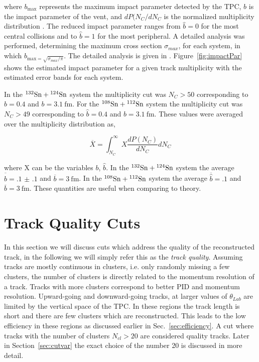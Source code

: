 where $b_{\mathrm{max}}$ represents the maximum impact parameter detected by the TPC, $b$ is the impact parameter of the vent,  and $dP(N_C/dN_C$ is the normalized multiplicity distribution \cite{reducedimpact}. The reduced impact parameter ranges from $\hat{b}=0$ for the most central collisions and to $\hat{b}=1$ for the most peripheral. A  detailed analysis was performed, determining the maximum cross section $\sigma_{max}$, for each system, in which $b_{\mathrm{max} = \sqrt{\sigma_{max}/\pi}}$. The detailed analysis is given in \cite{jon}. Figure~\ref{fig:impactPar} shows the estimated impact parameter for a given track multiplicity with the estimated error bands for each system. 

In the ${}^{132}\mathrm{Sn} + {}^{124}\mathrm{Sn}$ system the multiplicity cut was $N_C > 50$ corresponding to $\hat{b} = 0.4$ and $b = \SI{3.1}{\femto\metre}$. For the ${}^{108}\mathrm{Sn} + {}^{112}\mathrm{Sn}$ system the multiplicity cut was $N_C > 49$ corresponding to $\hat{b} = 0.4$ and $b = \SI{3.1}{\femto\metre}$. These values were averaged over the multiplicity distribution as,

\begin{equation}
 \overline{X} = \int_{N_C}^{\infty} X\frac{dP(N_C)}{dN_C} dN_C
\end{equation}

where X can be the variables $b$, $\hat{b}$. In the ${}^{132}\mathrm{Sn} + {}^{124}\mathrm{Sn}$ system the average $\overline{\hat{b}} = \num{.1(1)}$ and $\overline{b} = \SI{3}{\femto\metre}$. In the ${}^{108}\mathrm{Sn} + {}^{112}\mathrm{Sn}$ system the average $\overline{\hat{b}} = .1$ and $\overline{b} = \SI{3}{\femto\metre}$. These quantities are useful when comparing to theory. 

\section{Track Quality Cuts}
\label{sec:qualitycut}
In this section we will discuss cuts which address the quality of the reconstructed track, in the following we will simply refer this as the \emph{track quality}. Assuming tracks are mostly continuous in clusters, i.e. only randomly missing a few clusters, the number of clusters is directly related to the momentum resolution of a track. Tracks with more clusters correspond to better PID and momentum resolution. Upward-going and downward-going tracks, at larger values of $\theta_{Lab}$ are limited by the vertical space of the TPC. In these regions the track length is short and there are few clusters which are reconstructed. This leads to the low efficiency in these regions as discussed earlier in Sec.~\ref{sec:efficiency}. A cut where tracks with the number of clusters $N_{cl} > 20$ are considered quality tracks. Later in Section~\ref{sec:cutvar} the exact choice of the number 20 is discussed in more detail.

